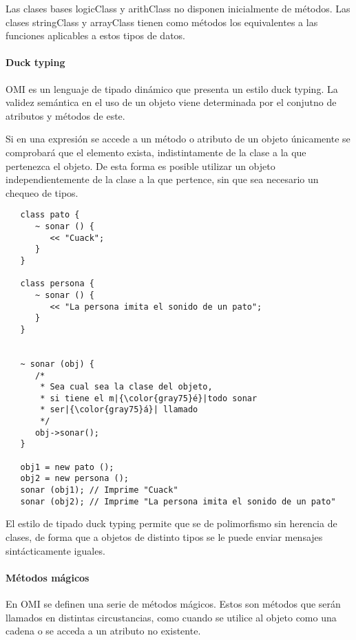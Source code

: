 Las clases bases logicClass y arithClass no disponen inicialmente de métodos.
Las clases stringClass y arrayClass tienen como métodos los equivalentes 
a las funciones aplicables a estos tipos de datos.

\paragraph{Duck typing}

OMI es un lenguaje de tipado dinámico que presenta un estilo duck typing.
La validez semántica en el uso de un objeto viene determinada
por el conjutno de atributos y métodos de este. 

Si en una expresión se accede a un método o atributo de un objeto únicamente se
comprobará que el elemento exista, indistintamente de la clase a la que pertenezca 
el objeto. De esta forma es posible utilizar un objeto independientemente de 
la clase a la que pertence, sin que sea necesario un chequeo de tipos. \\

\begin{lstlisting}
   class pato {
      ~ sonar () {
         << "Cuack";
      }
   }

   class persona {
      ~ sonar () {
         << "La persona imita el sonido de un pato";
      }
   }


   ~ sonar (obj) {
      /*
       * Sea cual sea la clase del objeto, 
       * si tiene el m|{\color{gray75}é}|todo sonar
       * ser|{\color{gray75}á}| llamado
       */
      obj->sonar();
   }

   obj1 = new pato ();
   obj2 = new persona ();
   sonar (obj1); // Imprime "Cuack"
   sonar (obj2); // Imprime "La persona imita el sonido de un pato"
\end{lstlisting}

El estilo de tipado duck typing permite que se de polimorfismo sin herencia de 
clases, de forma que a objetos de distinto tipos se le puede enviar mensajes sintácticamente iguales.  

\paragraph {Métodos mágicos} \label{sec:magic_method}

En OMI se definen una serie de métodos mágicos. Estos son métodos que serán 
llamados en distintas circustancias, como cuando se utilice al objeto 
como una cadena o se acceda a un atributo no existente. 

